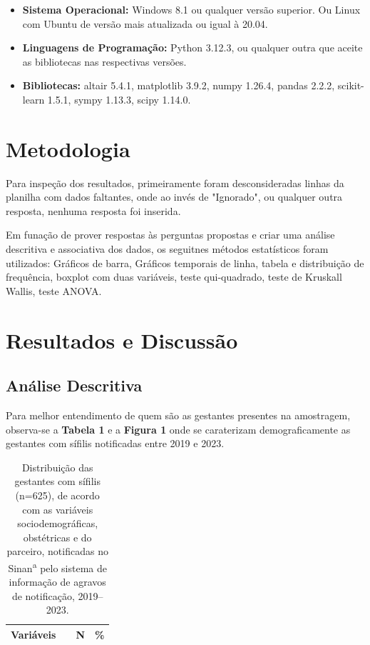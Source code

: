 \documentclass[a4paper]{article}
\begin{document}
\begin{multicols}
\begin{itemize}
    \item \textbf{Sistema Operacional:} Windows 8.1 ou qualquer versão superior. Ou Linux com Ubuntu de versão mais atualizada ou igual à 20.04.
    \item \textbf{Linguagens de Programação:} Python 3.12.3, ou qualquer outra que aceite as bibliotecas nas respectivas versões.
    \item \textbf{Bibliotecas:} altair 5.4.1, matplotlib 3.9.2, numpy 1.26.4, pandas 2.2.2, scikit-learn 1.5.1, sympy 1.13.3, scipy 1.14.0.
\end{itemize}

\section{Metodologia}
Para inspeção dos resultados, primeiramente foram desconsideradas linhas da planilha com dados faltantes, onde ao invés de "Ignorado", ou qualquer outra resposta, nenhuma resposta foi inserida.

Em funação de prover respostas às perguntas propostas e criar uma análise descritiva e associativa dos dados, os seguitnes métodos estatísticos foram utilizados: Gráficos de barra, Gráficos temporais de linha, tabela e distribuição de frequência, boxplot com duas variáveis, teste qui-quadrado, teste de Kruskall Wallis, teste ANOVA.

\section{Resultados e Discussão}

\subsection{Análise Descritiva}
Para melhor entendimento de quem são as gestantes presentes na amostragem, observa-se a \textbf{Tabela 1} e a \textbf{Figura 1} onde se caraterizam demograficamente as gestantes com sífilis notificadas entre 2019 e 2023.

\begin{table}[htbp]%
\centering
\caption{Distribuição das gestantes com sífilis (n=625), de acordo com as variáveis sociodemográficas, obstétricas e do parceiro, notificadas no Sinan\textsuperscript{a} pelo sistema de informação de agravos de notificação, 2019–2023.}
\begin{tabular}{@{}llcc@{}}
\toprule
\textbf{Variáveis} & & \textbf{N} & \textbf{\%} \\
\midrule


\end{tabular}
\end{table}
\end{multicols}
\end{document}
